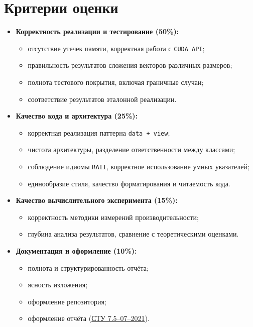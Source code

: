 \documentclass[12pt]{article}
\begin{document}
\section*{Критерии оценки}
\begin{itemize}
    \item \textbf{Корректность реализации и тестирование (50\%):}
    \begin{itemize}
        \item отсутствие утечек памяти, корректная работа с \texttt{CUDA API};
        \item правильность результатов сложения векторов различных размеров;
        \item полнота тестового покрытия, включая граничные случаи;
        \item соответствие результатов эталонной реализации.
    \end{itemize}

    \item \textbf{Качество кода и архитектура (25\%):}
    \begin{itemize}
        \item корректная реализация паттерна \texttt{data + view};
        \item чистота архитектуры, разделение ответственности между классами;
        \item соблюдение идиомы \texttt{RAII}, корректное использование умных указателей;
        \item единообразие стиля, качество форматирования и читаемость кода.
    \end{itemize}

    \item \textbf{Качество вычислительного эксперимента (15\%):}
    \begin{itemize}
        \item корректность методики измерений производительности;
        \item глубина анализа результатов, сравнение с теоретическими оценками.
    \end{itemize}

    \item \textbf{Документация и оформление (10\%):}
    \begin{itemize}
        \item полнота и структурированность отчёта;
        \item ясность изложения;
        \item оформление репозитория;
        \item оформление отчёта (\href{https://sfu.ru/sapi/file-upload/325396c75b669b84763c10b7b5c73ec1.pdf}{СТУ 7.5–07–2021}).
    \end{itemize}
\end{itemize}
\end{document}
